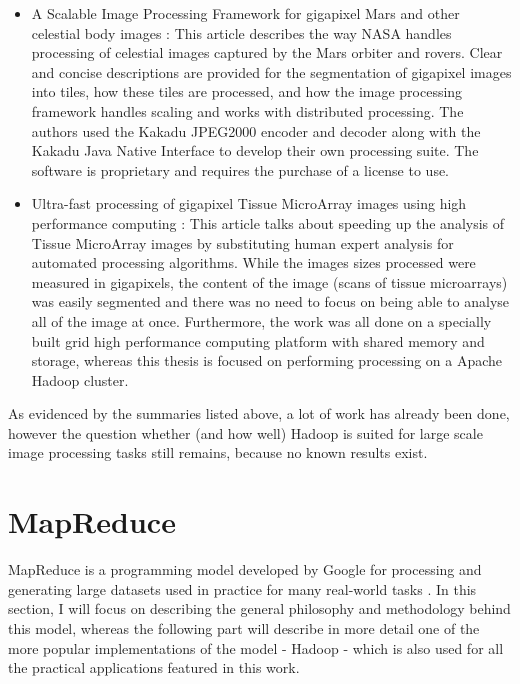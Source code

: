 \documentclass [12pt,a4paper]{report}
\begin{document}
\begin{itemize}
	\item A Scalable Image Processing Framework for gigapixel Mars and other celestial body  images \cite{5446706}: This article describes the way NASA handles processing of celestial images captured by the Mars orbiter and rovers. Clear and concise descriptions are provided for the segmentation of gigapixel images into tiles, how these tiles are processed, and how the image processing framework handles scaling and works with distributed processing. The authors used the Kakadu JPEG2000 encoder and decoder along with the Kakadu Java Native Interface to develop their own processing suite. The software is proprietary and requires the purchase of a license to use.
	\item Ultra-fast processing of gigapixel Tissue MicroArray images using high performance computing \cite{wang2011ult}: This article talks about speeding up the analysis of Tissue MicroArray images by substituting human expert analysis for automated processing algorithms. While the images sizes processed were measured in gigapixels, the content of the image (scans of tissue microarrays) was easily segmented and there was no need to focus on being able to analyse all of the image at once. Furthermore, the work was all done on a specially built grid high performance computing platform with shared memory and storage, whereas this thesis is focused on performing processing on a Apache Hadoop cluster.
\end{itemize}

As evidenced by the summaries listed above, a lot of work has already been done, however the question whether (and how well) Hadoop is suited for large scale image processing tasks still remains, because no known results exist.


\section{MapReduce}

MapReduce is a programming model developed by Google for processing and generating large datasets used in practice for many real-world tasks \cite{Dean:2008:MSD:1327452.1327492}. In this section, I will focus on describing the general philosophy and methodology behind this model, whereas the following part will describe in more detail one of the more popular implementations of the model - Hadoop - which is also used for all the practical applications featured in this work.
\end{document}
